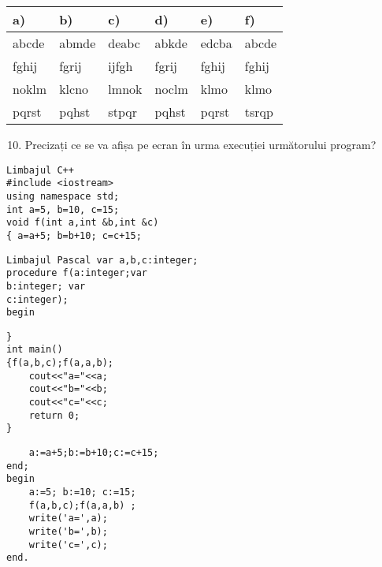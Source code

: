 \begin{center}
\begin{tabular}{|l|l|l|l|l|l|}
\hline
a) & b) & c) & d) & e) & f) \\
\hline
abcde & abmde & deabc & abkde & edcba & abcde \\
\hline
fghij & fgrij & ijfgh & fgrij & fghij & fghij \\
\hline
noklm & klcno & lmnok & noclm & klmo & klmo \\
\hline
pqrst & pqhst & stpqr & pqhst & pqrst & tsrqp \\
\hline
\end{tabular}
\end{center}

\begin{enumerate}
  \setcounter{enumi}{9}
  \item Precizați ce se va afișa pe ecran în urma execuției următorului program?
\end{enumerate}

\begin{verbatim}
Limbajul C++
#include <iostream>
using namespace std;
int a=5, b=10, c=15;
void f(int a,int &b,int &c)
{ a=a+5; b=b+10; c=c+15;
\end{verbatim}

\begin{verbatim}
Limbajul Pascal var a,b,c:integer;
procedure f(a:integer;var
b:integer; var
c:integer);
begin
\end{verbatim}

\begin{verbatim}
}
int main()
{f(a,b,c);f(a,a,b);
    cout<<"a="<<a;
    cout<<"b="<<b;
    cout<<"c="<<c;
    return 0;
}
\end{verbatim}

\begin{verbatim}
    a:=a+5;b:=b+10;c:=c+15;
end;
begin
    a:=5; b:=10; c:=15;
    f(a,b,c);f(a,a,b) ;
    write('a=',a);
    write('b=',b);
    write('c=',c);
end.
\end{verbatim}

